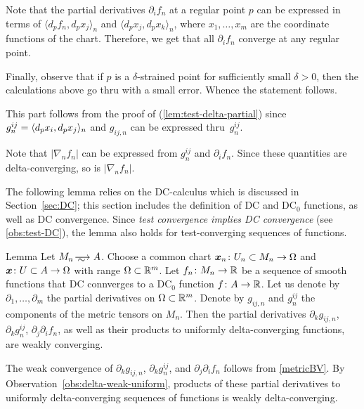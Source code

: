 Note that the partial derivatives $\partial_if_n$ at a regular point $p$ can be expressed in terms of $\langle d_pf_n,d_px_j\rangle_n$ and $\langle d_px_j,d_px_k\rangle_n$, where $x_1,\dots,x_m$ are the coordinate functions of the chart.
Therefore, we get that all $\partial_if_n$ converge at any regular point.

Finally, observe that if $p$ is a $\delta$-strained point for sufficiently small $\delta>0$,
then the calculations above go thru with a small error.
Whence the statement follows.

This part follows from the proof of (\ref{lem:test-delta-partial}) since $g^{ij}_n\zz=\langle d_px_i,d_px_j\rangle_n$ and $g_{ij,n}$ can be expressed thru~$g^{ij}_n$.

Note that $|\nabla_n f_n|$ can be expressed from $g^{ij}_n$ and $\partial_if_n$.
Since these quantities are delta-converging, so is $|\nabla_n f_n|$.
\qeds

The following lemma relies on the DC-calculus which is discussed in Section~\ref{sec:DC};
this section includes the definition of DC and DC$_0$ functions, as well as DC convergence.
Since \textit{test convergence implies DC convergence} (see \ref{obs:test-DC}),
the lemma also holds for test-converging sequences of functions.


\begin{thm}{Lemma}\label{lem:test-delta-partial-g}
Let $M_n\smooths{} A$.
Choose a common chart $\bm{x}_n\:U_n\subset M_n\zz\to \Omega$ and $\bm{x}\:U\subset A\zz\to \Omega$ with range $\Omega\subset \mathbb{R}^m$.
Let $f_n\colon M_n\to\mathbb{R}$ be a sequence of smooth functions that DC connverges to a DC$_0$ function $f\colon A\to \mathbb{R}$.
Let us denote by $\partial_1,\dots,\partial_m$ the partial derivatives on $\Omega\subset \mathbb{R}^m$.
Denote by $g_{ij,n}$ and $g^{ij}_n$ the components of the metric tensors on $M_n$.
Then  the partial derivatives $\partial_kg_{ij,n}$, $\partial_k g^{ij}_n$,  $\partial_j\partial_if_n$, as well as their products to uniformly delta-converging functions,  are weakly converging.

\end{thm}

The weak convergence of $\partial_kg_{ij,n}$, $\partial_k g^{ij}_n$, and $\partial_j\partial_if_n$
follows from \ref{metricBV}.
By Observation~\ref{obs:delta-weak-uniform}, products of these partial derivatives to uniformly delta-converging sequences of functions is weakly delta-converging.

